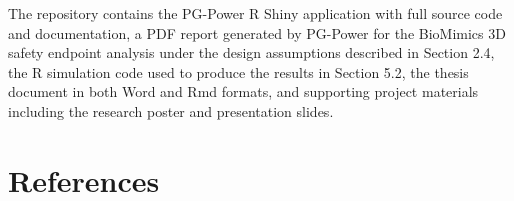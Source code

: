\documentclass{article}
\begin{document}
The repository contains the PG-Power R Shiny application with full
source code and documentation, a PDF report generated by PG-Power for
the BioMimics 3D safety endpoint analysis under the design assumptions
described in Section 2.4, the R simulation code used to produce the
results in Section 5.2, the thesis document in both Word and Rmd
formats, and supporting project materials including the research poster
and presentation slides.

\newpage
\renewcommand{\refname}{}

\section*{References}\label{references}

\protect{}\label{refs}
\end{document}
